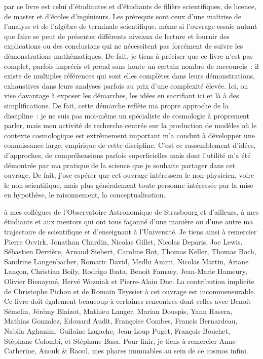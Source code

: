  par ce livre est celui d'étudiantes et d'étudiants de filière scientifiques, de licence, de master et d'écoles d'ingénieurs. Les prérequis sont ceux d'une maîtrise de l'analyse et de l'algèbre de terminale scientifique, même si l'ouvrage essaie autant que faire se peut de présenter différents niveaux de lecture et fournir des explications ou des conclusions qui ne nécessitent pas forcément de suivre les démonstrations mathématiques. De fait, je tiens à préciser que ce livre n'est pas complet, parfois imprécis et prend sans honte un certain nombre de raccourcis~: il existe de multiples références qui sont elles complètes dans leurs démonstrations, exhaustives dans leurs analyses parfois au prix d'une complexité élevée. Ici, on vise davantage à exposer les démarches, les idées en sacrifiant ici et là à des simplifications. De fait, cette démarche reflète ma propre approche de la discipline~: je ne suis pas moi-même un spécialiste de cosmologie à proprement parler, mais mon activité de recherche centrée sur la production de modèles où le contexte cosmologique est extrêmement important m'a conduit à développer une connaissance large, empirique de cette discipline. C'est ce rassemblement d'idées, d'approches, de compréhensions parfois superficielles mais dont l'utilité m'a été démontrée par ma pratique de la science que je souhaite partager dans cet ouvrage. De fait, j'ose espérer que cet ouvrage intéressera le non-physicien, voire le non scientifique, mais plus généralement toute personne intéressée par la mise en hypothèse, le raisonnement, la conceptualisation.

 à mes collègues de l'Observatoire Astronomique de Strasbourg et d'ailleurs, à mes étudiants et aux mentors qui ont tous façonné d'une manière ou d'une autre ma trajectoire de scientifique et d'enseignant à l'Université. Je tiens ainsi à remercier Pierre Ocvirk, Jonathan Chardin, Nicolas Gillet, Nicolas Deparis, Joe Lewis, Sébastien Derrière, Arnaud Siebert, Caroline Bot, Thomas Keller, Thomas Boch, Sandrine Langenbacher, Romaric David, Medhi Amini, Nicolas Martin, Ariane Lançon, Christian Boily, Rodrigo Ibata, Benoit Famaey, Jean-Marie Hameury, Olivier Bienaymé, Hervé Wozniak et Pierre-Alain Duc. La contribution implicite de Christophe Pichon et de Romain Teyssier à cet ouvrage est incommensurable. Ce livre doit également beaucoup à certaines rencontres dont celles avec Benoit Sémelin, Jérémy Blaizot, Mathieu Langer, Marian Douspis, Yann Rasera, Mathias Gonzalez, Edouard Audit, Françoise Combes, Francis Bernardeau, Nabila Aghanim, Guilaine Lagache, Jean-Loup Puget, François Bouchet, Stéphane Colombi, et Stéphane Basa. Pour finir, je tiens à remercier Anne-Catherine, Anouk \& Raoul, mes phares immuables au sein de ce cosmos infini.